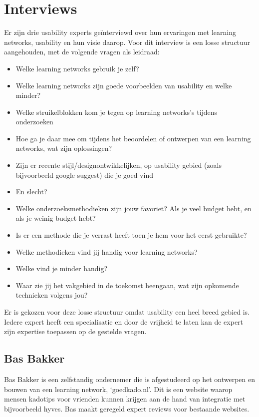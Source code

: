 \chapter{Interviews}
\label{interviewappendix}
Er zijn drie usability experts ge\"interviewd over hun ervaringen met learning networks, usability en hun visie daarop. Voor dit interview is een losse structuur aangehouden, met de volgende vragen als leidraad:

\begin{itemize}
  \item Welke learning networks gebruik je zelf?
  \item Welke learning networks zijn goede voorbeelden van usability en welke minder?

  \item Welke struikelblokken kom je tegen op learning networks's tijdens onderzoeken
  \item Hoe ga je daar mee om tijdens het beoordelen of ontwerpen van een learning networks, wat zijn oplossingen?

  \item Zijn er recente stijl/designontwikkelijken, op usability gebied (zoals bijvoorbeeld google suggest) die je goed vind
  \item En slecht?

  \item Welke onderzoeksmethodieken zijn jouw favoriet? Als je veel budget hebt, en als je weinig budget hebt?
  \item Is er een methode die je verrast heeft toen je hem voor het eerst gebruikte?

  \item Welke methodieken vind jij handig voor learning networks?
  \item Welke vind je minder handig?

  \item Waar zie jij het vakgebied in de toekomst heengaan, wat zijn opkomende technieken volgens jou?
\end{itemize}

Er is gekozen voor deze losse structuur omdat usability een heel breed gebied is. Iedere expert heeft een specialisatie en door de vrijheid te laten kan de expert zijn expertise toepassen op de gestelde vragen.

\section{Bas Bakker}
Bas Bakker is een zelfstandig ondernemer die is afgestudeerd op het ontwerpen en bouwen van een learning network, `goedkado.nl'. Dit is een website waarop mensen kadotips voor vrienden kunnen krijgen aan de hand van integratie met bijvoorbeeld hyves. Bas maakt geregeld expert reviews voor bestaande websites.


